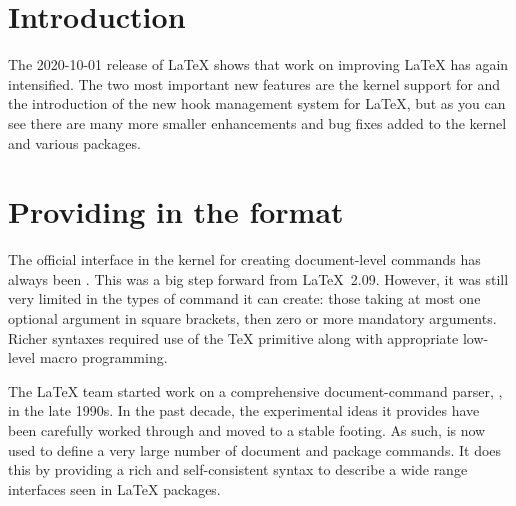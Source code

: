 \documentclass{ltnews}
\begin{document}

\maketitle
{ \spaceskip=3.33pt  \tableofcontents}

\setlength{}


\medskip


\section{Introduction}

The 2020-10-01 release of \LaTeX{} shows that work on improving
\LaTeX{} has again intensified. The two most important new features
are the kernel support for  and the introduction of the
new hook management system for \LaTeX{}, but as you can see there are
many more smaller enhancements and bug fixes added to the kernel and
various packages.



\section{Providing  in the format}

The official interface in the \LaTeXe{} kernel for creating
document-level commands has always been . This was a
big step forward from \LaTeX~2.09. However, it was still very limited
in the types of command it can create: those taking at most one
optional argument in square brackets, then zero or more mandatory
arguments. Richer syntaxes required use of the \TeX{} 
primitive along with appropriate low-level macro programming.

The \LaTeX{} team started work on a comprehensive document-command
parser, , in the late 1990s. In the past decade, the
experimental ideas it provides have been carefully worked through and
moved to a stable footing. As such,  is now used to define
a very large number of document and package commands. It does this by
providing a rich and self-consistent syntax to describe a wide range
interfaces seen in \LaTeX{} packages.
\end{document}
